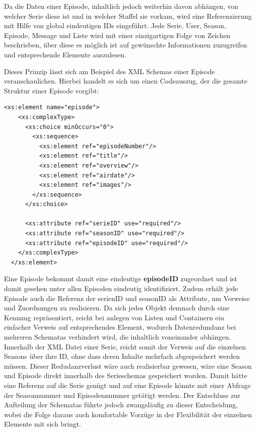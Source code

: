 \documentclass[a4paper]{article}
\begin{document}
Da die Daten einer Episode, inhaltlich jedoch weiterhin davon abhängen, von welcher Serie diese ist und in welcher Staffel sie vorkam, wird eine Referenzierung mit Hilfe von global eindeutigen IDs eingeführt. Jede Serie, User, Season, Episode, Message und Liste wird mit einer einzigartigen Folge von Zeichen beschrieben, über diese es möglich ist auf gewünschte Informationen zuzugreifen und entsprechende Elemente auszulesen.

Dieses Prinzip lässt sich am Beispiel des XML Schemas einer Episode veranschaulichen. Hierbei handelt es sich um einen Codeauszug, der die gesamte Struktur einer Episode vorgibt:
\begin{lstlisting}[label=xsd-definition,caption= Definition des complexElement Episode mit Elementen und Attributen]
  <xs:element name="episode">
    <xs:complexType>
      <xs:choice minOccurs="0">
        <xs:sequence>
          <xs:element ref="episodeNumber"/>
          <xs:element ref="title"/>
          <xs:element ref="overview"/>
          <xs:element ref="airdate"/>
          <xs:element ref="images"/>
        </xs:sequence>
      </xs:choice>

      <xs:attribute ref="serieID" use="required"/>
      <xs:attribute ref="seasonID" use="required"/>
      <xs:attribute ref="episodeID" use="required"/>
    </xs:complexType>
  </xs:element>
\end{lstlisting}

Eine Episode bekommt damit eine eindeutige \textbf{episodeID} zugeordnet und ist damit gesehen unter allen Episoden eindeutig identifiziert. Zudem erhält jede Episode auch die Referenz der serienID und seasonID als Attribute, um Verweise und Zuordnungen zu realisieren. Da sich jedes Objekt demnach durch eine Kennung repräsentiert, reicht bei anlegen von Listen und Containern ein einfacher Verweis auf entsprechendes Element, wodurch Datenredundanz bei mehreren Schematas verhindert wird, die inhaltlich voneinander abhängen. Innerhalb der XML Datei einer Serie, reicht somit der Verweis auf die einzelnen Seasons über ihre ID, ohne dass deren Inhalte mehrfach abgespeichert werden müssen. 
Dieser Redudanzverlust wäre auch realisierbar gewesen, wäre eine Season und Episode direkt innerhalb des Serieschemas gespeichert worden. Damit hätte eine Referenz auf die Serie genügt und auf eine Episode könnte mit einer Abfrage der Seasonnummer und Episodennummer getätigt werden. Der Entschluss zur Aufteilung der Schematas führte jedoch zwangsläufig zu dieser Entscheidung, wobei die Folge daraus auch komfortable Vorzüge in der Flexibilität der einzelnen Elemente mit sich bringt.
\end{document}
